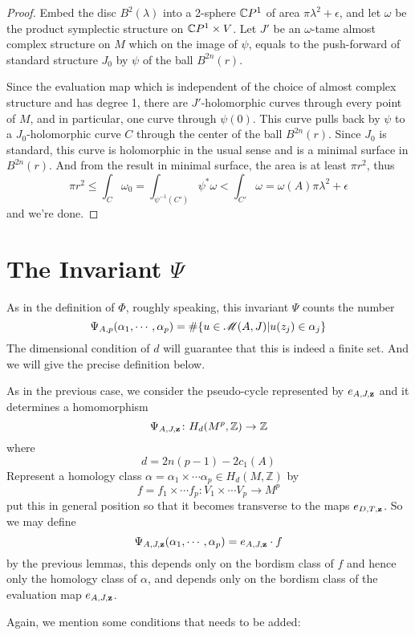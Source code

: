 \documentclass[twoside]{article}
\begin{document}
\begin{proof}
    Embed the disc $B^2(\lambda)$ into a 2-sphere $\mathbb{C}P^{1}$ of area $\pi\lambda^2+\epsilon$, 
    and let $\omega$ be the product symplectic structure on $\mathbb{C}P^{1}\times V$. 
    Let $J'$ be an $\omega$-tame almost complex structure on $M$ which on the image of $\psi$, 
    equals to the push-forward of standard structure $J_0$ by $\psi$ of the ball $B^{2n}(r)$.
    
    Since the evaluation map which is independent of the choice of 
    almost complex structure and has degree 1, 
    there are $J'$-holomorphic curves through every point of $M$, 
    and in particular, one curve through $\psi(0)$. 
    This curve pulls back by $\psi$ to a $J_0$-holomorphic curve $C$ through 
    the center of the ball $B^{2n}(r)$. Since $J_0$ is standard, 
    this curve is holomorphic in the usual sense and is a minimal surface in $B^{2n}(r)$. 
    And from the result in minimal surface, the area is at least $\pi r^2$, thus
    \[\pi r^2\leq\int_C \omega_0=\int_{\psi^{-1}(C')}\psi^*\omega<\int_{C'}\omega=\omega(A)\pi\lambda^2+\epsilon\]
    and we're done.
\end{proof}

\section{The Invariant \texorpdfstring{$\Psi$}{Ψ}}

As in the definition of $\Phi$, roughly speaking, this invariant $\Psi$ counts the number
\[\Psi_{A,p}(\alpha_1,\cdots,\alpha_p)=\#\{ u\in\mathscr{M}(A,J)|u(z_j)\in\alpha_j  \}\]
The dimensional condition of $d$ will guarantee that this is indeed a finite set. 
And we will give the precise definition below.

As in the previous case, we consider the pseudo-cycle represented by $e_{A,J,\mathbf{z}}$ 
and it determines a homomorphism
\[\Psi_{A,J,\mathbf{z}}\colon H_d(M^p,\mathbb{Z})\rightarrow \mathbb{Z}\]
where
\[d=2n(p-1)-2c_1(A)\]
Represent a homology class $\alpha=\alpha_1\times\cdots\alpha_p\in H_d(M,\mathbb{Z})$ by 
\[f=f_1\times\cdots f_p\colon V_1\times\cdots V_p\rightarrow M^p\]
put this in general position so that it becomes transverse to the maps $e_{D,T,\mathbf{z}}$.
So we may define
\[\Psi_{A,J,\mathbf{z}}(\alpha_1,\cdots,\alpha_p)=e_{A,J,\mathbf{z}}\cdot f\]
by the previous lemmas, this depends only on the bordism class of $f$ 
and hence only the homology class of $\alpha$, 
and depends only on the bordism class of the evaluation map $e_{A,J,\mathbf{z}}$.

Again, we mention some conditions that needs to be added:
\end{document}

